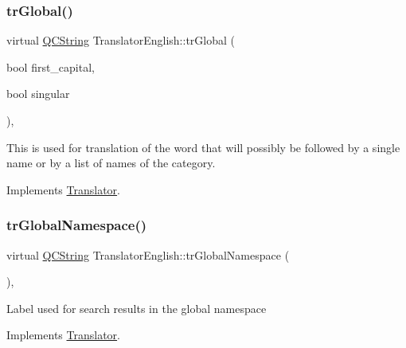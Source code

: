 \mbox{\label{class_translator_english_a46d3dee705cc67e71abfcf66e91f4d52}} 
\subsubsection{\texorpdfstring{trGlobal()}{trGlobal()}}
{\footnotesize\ttfamily virtual \mbox{\hyperlink{class_q_c_string}{Q\+C\+String}} Translator\+English\+::tr\+Global (\begin{DoxyParamCaption}\item[{bool}]{first\+\_\+capital,  }\item[{bool}]{singular }\end{DoxyParamCaption})\hspace{0.3cm}{\ttfamily [inline]}, {\ttfamily [virtual]}}

This is used for translation of the word that will possibly be followed by a single name or by a list of names of the category. 

Implements \mbox{\hyperlink{class_translator}{Translator}}.

\mbox{\label{class_translator_english_a2e97b6bdf3dd38afa888dc2704161ef2}} 
\subsubsection{\texorpdfstring{trGlobalNamespace()}{trGlobalNamespace()}}
{\footnotesize\ttfamily virtual \mbox{\hyperlink{class_q_c_string}{Q\+C\+String}} Translator\+English\+::tr\+Global\+Namespace (\begin{DoxyParamCaption}{ }\end{DoxyParamCaption})\hspace{0.3cm}{\ttfamily [inline]}, {\ttfamily [virtual]}}

Label used for search results in the global namespace 

Implements \mbox{\hyperlink{class_translator}{Translator}}.

\mbox{\label{class_translator_english_a1b650694e5af59250a2168d11369d484}} 
